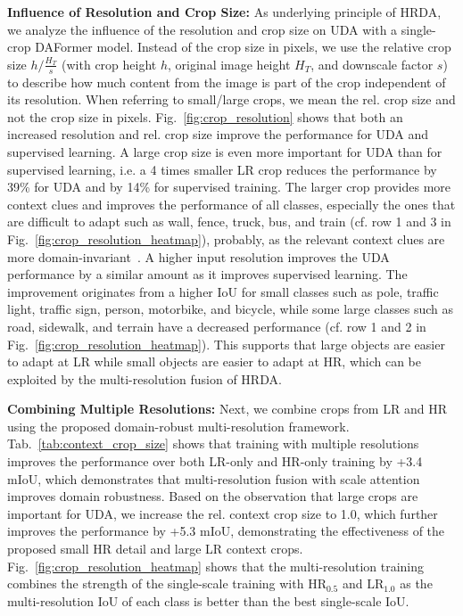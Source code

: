 \documentclass[journal,compsoc]{IEEEtran}
\begin{document}
\noindent\textbf{Influence of Resolution and Crop Size:}
As underlying principle of HRDA, we analyze the influence of the resolution and crop size on UDA with a single-crop DAFormer model.
Instead of the crop size in pixels, we use the relative crop size $h / \frac{H_T}{s}$ (with crop height $h$, original image height $H_T$, and downscale factor $s$) to describe how much content from the image is part of the crop independent of its resolution. When referring to small/large crops, we mean the rel. crop size and not the crop size in pixels.
Fig.~\ref{fig:crop_resolution} shows that both an increased resolution and rel. crop size improve the performance for UDA and supervised learning. 
A large crop size is even more important for UDA than for supervised learning, i.e. a 4 times smaller LR crop reduces the performance by 39\% for UDA and by 14\% for supervised training. The larger crop provides more context clues and improves the performance of all classes, especially the ones that are difficult to adapt such as wall, fence, truck, bus, and train (cf. row 1 and 3 in Fig.~\ref{fig:crop_resolution_heatmap}), probably, as the relevant context clues are more domain-invariant~\cite{huang2020contextual, yang2021context}.
A higher input resolution improves the UDA performance by a similar amount as it improves supervised learning. The improvement originates from a higher IoU for small classes such as pole, traffic light, traffic sign, person, motorbike, and bicycle, while some large classes such as road, sidewalk, and terrain have a decreased performance (cf. row 1 and 2 in Fig.~\ref{fig:crop_resolution_heatmap}). This supports that large objects are easier to adapt at LR while small objects are easier to adapt at HR, which can be exploited by the multi-resolution fusion of HRDA.

\noindent\textbf{Combining Multiple Resolutions:} Next, we combine crops from LR and HR using the proposed domain-robust multi-resolution framework. Tab.~\ref{tab:context_crop_size} shows that training with multiple resolutions improves the performance over both LR-only and HR-only training by +3.4 mIoU, which demonstrates that multi-resolution fusion with scale attention improves domain robustness. Based on the observation that large crops are important for UDA, we increase the rel. context crop size to 1.0, which further improves the performance by +5.3 mIoU, demonstrating the effectiveness of the proposed small HR detail and large LR context crops. Fig.~\ref{fig:crop_resolution_heatmap} shows that the multi-resolution training combines the strength of the single-scale training with $\text{HR}_{0.5}$ and $\text{LR}_{1.0}$ as the multi-resolution IoU of each class is better than the best single-scale IoU.
\end{document}

